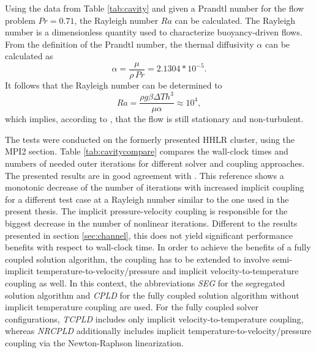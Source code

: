 Using the data from Table \ref{tab:cavity} and given a Prandtl number for the flow problem \(Pr = 0.71\), the Rayleigh number \(Ra\) can be calculated. The Rayleigh number is a dimensionless quantity used to characterize buoyancy-driven flows. From the definition of the Prandtl number, the thermal diffusivity \(\alpha\) can be calculated as
\begin{displaymath}
  \alpha = \frac{\mu}{\rho \, Pr} = 2.1304 * 10^{-5}.
\end{displaymath}
It follows that the Rayleigh number can be determined to 
\begin{displaymath}
  Ra = \frac{\rho g \beta \Delta T h^3}{\mu \alpha} \approx 10^4,
\end{displaymath}
which implies, according to \cite{christon02}, that the flow is still stationary and non-turbulent.

The tests were conducted on the formerly presented HHLR cluster, using the MPI2 section. Table \ref{tab:cavitycompare} compares the wall-clock times and numbers of needed outer iterations for different solver and coupling approaches. The presented results are in good agreement with \cite{vakilipour12}. This reference shows a monotonic decrease of the number of iterations with increased implicit coupling for a different test case at a Rayleigh number similar to the one used in the present thesis. The implicit pressure-velocity coupling is responsible for the biggest decrease in the number of nonlinear iterations. Different to the results presented in section \ref{sec:channel}, this does not yield significant performance benefits with respect to wall-clock time. In order to achieve the benefits of a fully coupled solution algorithm, the coupling has to be extended to involve semi-implicit temperature-to-velocity/pressure and implicit velocity-to-temperature coupling as well. In this context, the abbreviations \emph{SEG} for the segregated solution algorithm and \emph{CPLD} for the fully coupled solution algorithm without implicit temperature coupling are used. For the fully coupled solver configurations, \emph{TCPLD} includes only implicit velocity-to-temperature coupling, whereas \emph{NRCPLD} additionally includes implicit temperature-to-velocity/pressure coupling via the Newton-Raphson linearization.


